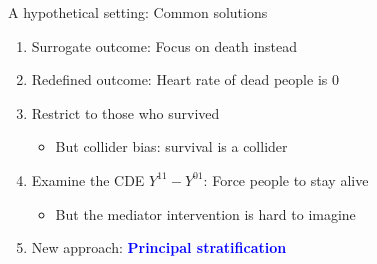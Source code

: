 \documentclass{beamer}
\newcommand\bblue[1]{\textcolor{blue}{\textbf{#1}}}
\begin{document}
\begin{frame}{A hypothetical setting: Common solutions}
 \pause
\begin{enumerate}
\item Surrogate outcome: Focus on death instead \pause
\item Redefined outcome: Heart rate of dead people is 0 \pause
\item Restrict to those who survived \pause
\begin{itemize}
\item But collider bias: survival is a collider \pause
\end{itemize}
\item Examine the CDE $Y^{11} - Y^{01}$: Force people to stay alive \pause
\begin{itemize}
\item But the mediator intervention is hard to imagine \pause
\end{itemize}
\item New approach: \bblue{Principal stratification}
\end{enumerate}

\end{frame}
\end{document}
